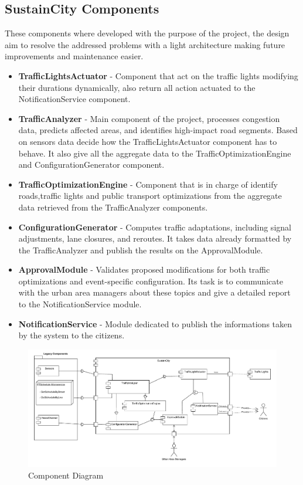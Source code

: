\documentclass[a4paper,12pt]{article}
\begin{document}
\subsection*{SustainCity Components}
These components where developed with the purpose of the project, the design aim to resolve the addressed problems with a light architecture making future improvements and maintenance easier.  
\begin{itemize}
    \item \textbf{TrafficLightsActuator} - Component that act on the traffic lights modifying their durations dynamically, also return all action actuated to the NotificationService component.
    \item \textbf{TrafficAnalyzer} - Main component of the project, processes congestion data, predicts affected areas,
    and identifies high-impact road segments.
    Based on sensors data decide how the TrafficLightsActuator component has to behave.
    It also give all the aggregate data to the TrafficOptimizationEngine and ConfigurationGenerator component.
    \item \textbf{TrafficOptimizationEngine} - Component that is in charge of identify roads,traffic lights and public transport optimizations from the aggregate data retrieved from the TrafficAnalyzer components. 
    \item \textbf{ConfigurationGenerator} - Computes traffic adaptations, including signal adjustments, lane closures, and reroutes. It takes data already formatted by the TrafficAnalyzer and publish the results on the ApprovalModule.
    \item \textbf{ApprovalModule} - Validates proposed modifications for both traffic optimizations and event-specific configuration. Its task is to communicate with the urban area managers about these topics and give a detailed report to the NotificationService module. 
    \item \textbf{NotificationService} - Module dedicated to publish the informations taken by the system to the citizens.
\end{itemize}
\begin{figure}[h]
    \centering
    \includegraphics[width=1\textwidth]{diagrams/ComponentDiagram1.pdf}
    \caption{Component Diagram}
    \label{fig:Public_Engagement_and_Notification.drawio}
\end{figure}
\end{document}
